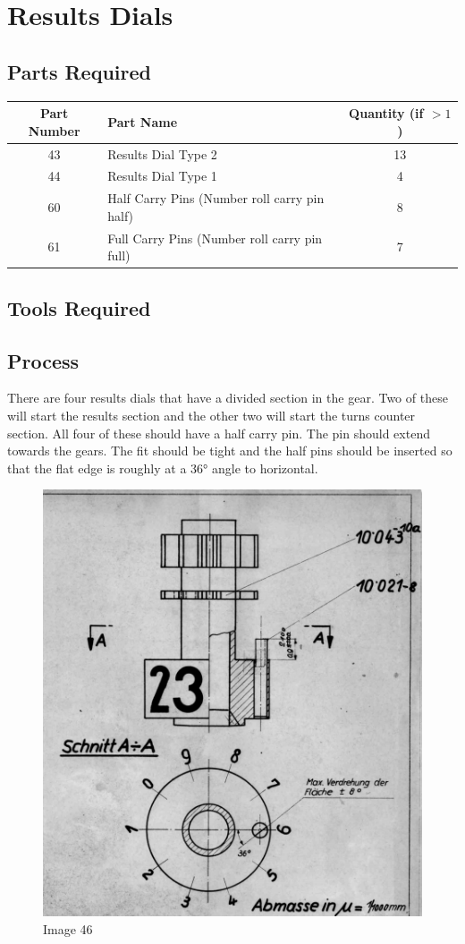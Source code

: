 \documentclass[openany]{book}
\begin{document}
\chapter{Results Dials}
\section{Parts Required}

\begin{table}[!ht]
	\centering
	\begin{tabular}{clc}
		Part Number & Part Name & Quantity (if $>1$) \\ \hline
		43 & Results Dial Type 2 & 13 \\
		44 & Results Dial Type 1 & 4 \\
		60 & Half Carry Pins (Number roll carry pin half) & 8\\
		61 & Full Carry Pins (Number roll carry pin full) & 7
	\end{tabular}
\end{table}

\section{Tools Required}

\section{Process}
There are four results dials that have a divided section in the gear. Two of these will start the results section and the other two will start the turns counter section. All four of these should have a half carry pin. The pin should extend towards the gears. The fit should be tight and the half pins should be inserted so that the flat edge is roughly at a 36° angle to horizontal.

\begin{figure}[!ht]
	\centering
	\includegraphics[width=.55\textwidth]{images/image46.png}
	\caption{Image 46}
	\label{fig:image46}	
\end{figure}
\end{document}
